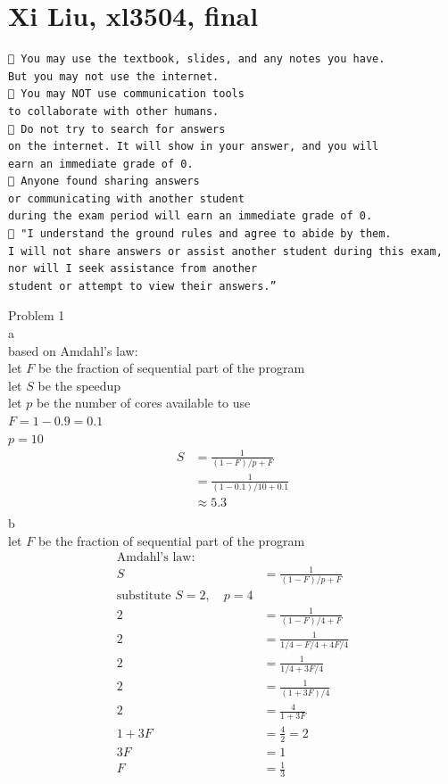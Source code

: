 \documentclass[12pt,border=4pt,multi]{article} %
\begin{document}
\section*{Xi Liu, xl3504, final}
\begin{verbatim}
 You may use the textbook, slides, and any notes you have.
But you may not use the internet. 
 You may NOT use communication tools 
to collaborate with other humans.
 Do not try to search for answers
on the internet. It will show in your answer, and you will 
earn an immediate grade of 0. 
 Anyone found sharing answers 
or communicating with another student
during the exam period will earn an immediate grade of 0. 
 "I understand the ground rules and agree to abide by them. 
I will not share answers or assist another student during this exam,
nor will I seek assistance from another 
student or attempt to view their answers.” 
\end{verbatim}
\newpage
\noindent
Problem 1\\
a\\
based on Amdahl's law:\\
let $F$ be the fraction of sequential part of the program\\
let $S$ be the speedup\\
let $p$ be the number of cores available to use\\
$F = 1 - 0.9 = 0.1$\\
$p = 10$\\
\begin{align*}
S &= \frac{1}{(1 - F)/p + F}\\
&= \frac{1}{(1 - 0.1)/10 + 0.1}\\
&\approx \boxed{5.3}\\
\end{align*}
\newpage 
\noindent
b\\
let $F$ be the fraction of sequential part of the program
\begin{align*}
\text{Amdahl's law:}\\
S &= \frac{1}{(1 - F)/p + F}\\
\text{substitute } S = 2, \quad p = 4\\
2 &= \frac{1}{(1 - F)/4 + F}\\
2 &= \frac{1}{1/4 - F/4 + 4F/4}\\
2 &= \frac{1}{1/4 + 3F/4}\\
2 &= \frac{1}{(1 + 3F)/4}\\
2 &= \frac{4}{1 + 3F}\\
1 + 3F &= \frac{4}{2} = 2\\
3F &= 1\\
F &= \boxed{\frac{1}{3}}\\
\end{align*}
\end{document}
